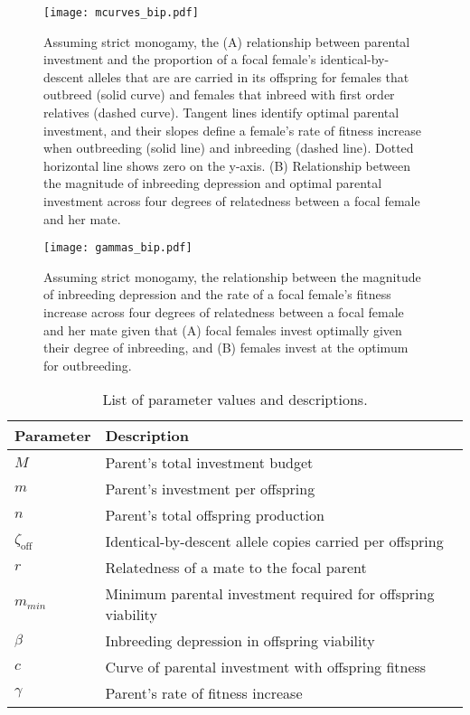\documentclass[12pt]{article}
\begin{document}
\clearpage
\begin{figure}
\begin{center}				
\texttt{[image: mcurves\_bip.pdf]}
\end{center}
\caption{Assuming strict monogamy, the (A) relationship between parental investment and the proportion of a focal female's identical-by-descent alleles that are are carried in its offspring for females that outbreed (solid curve) and females that inbreed with first order relatives (dashed curve). Tangent lines identify optimal parental investment, and their slopes define a female's rate of fitness increase when outbreeding (solid line) and inbreeding (dashed line). Dotted horizontal line shows zero on the y-axis. (B) Relationship between the magnitude of inbreeding depression and optimal parental investment across four degrees of relatedness between a focal female and her mate.}
\label{mcurves_bip}
\end{figure}

\clearpage
\begin{figure}
\begin{center}				
\texttt{[image: gammas\_bip.pdf]}
\end{center}
\caption{Assuming strict monogamy, the relationship between the magnitude of inbreeding depression and the rate of a focal female's fitness increase across four degrees of relatedness between a focal female and her mate given that (A) focal females invest optimally given their degree of inbreeding, and (B) females invest at the optimum for outbreeding.}
\label{gammas_bip}
\end{figure}



\clearpage
\singlespacing
\begin{table}[H]
\begin{center}
\begin{tabular}{ll}
\hline
Parameter & Description & \\
\hline
$M$                     & Parent's total investment budget  & \\
$m$                     & Parent's investment per offspring & \\
$n$                     & Parent's total offspring production & \\
$\zeta_{\textrm{off}}$  & Identical-by-descent allele copies carried per offspring & \\
$r$                     & Relatedness of a mate to the focal parent & \\
$m_{min}$               & Minimum parental investment required for offspring viability & \\
$\beta$                 & Inbreeding depression in offspring viability & \\
$c$                     & Curve of parental investment with offspring fitness & \\
$\gamma$                & Parent's rate of fitness increase & \\
\hline	
\end{tabular}
\end{center}
\caption{List of parameter values and descriptions.}
\label{parameters}
\end{table}
\end{document}
